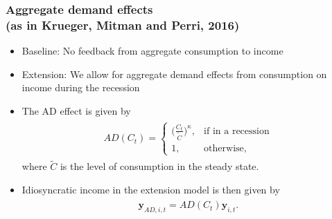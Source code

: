 \documentclass[pdflatex,aspectratio=169]{beamer}
\begin{document}
\begin{frame}
  \frametitle{Aggregate demand effects \\
    \small (as in Krueger, Mitman and Perri, 2016) \normalsize}
  \begin{itemize}[<+->]
    \itemsep = .5\bigskipamount
    \item
          Baseline: No feedback from aggregate consumption to income
    \item
          Extension: We allow for aggregate demand effects from consumption on income during the recession

    \item
          The AD effect is given by
          \begin{equation}
            \begin{gathered}
              \begin{aligned}
                AD(C_t) =   \begin{cases}
                              \Big(\frac{C_t}{\tilde{C}}\Big)^\kappa, & \text{if in a recession} \\
                              1,                                      & \text{otherwise} ,
                            \end{cases}
              \end{aligned}
            \end{gathered}
          \end{equation}
          where $\tilde{C}$ is the level of consumption in the steady state.

    \item
          Idiosyncratic income in the extension model is then given by
          \begin{equation}
            \begin{gathered}
              \begin{aligned}
                \mathbf{y}_{AD,i,t} = AD(C_t)\mathbf{y}_{i,t}.
              \end{aligned}
            \end{gathered}
          \end{equation}
  \end{itemize}
\end{frame}
\end{document}
